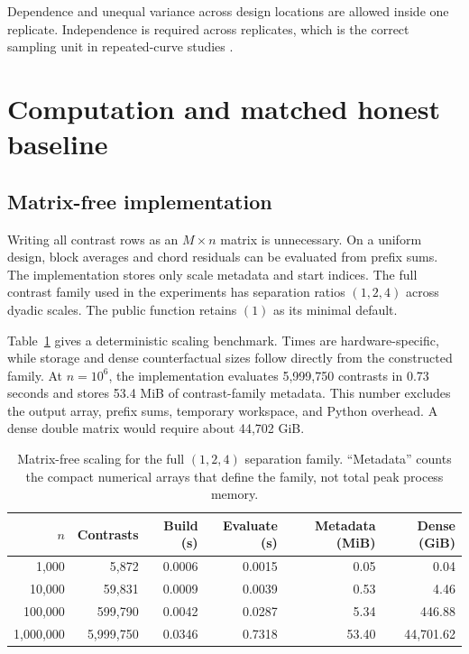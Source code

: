 \documentclass{interact}
\theoremstyle{definition}
\theoremstyle{remark}
\begin{document}
Dependence and unequal variance across design locations are allowed inside one
replicate.  Independence is required across replicates, which is the correct
sampling unit in repeated-curve studies \citep{davidian1995nonlinear}.

\section{Computation and matched honest baseline}
\label{sec:computation}

\subsection{Matrix-free implementation}

Writing all contrast rows as an $M\times n$ matrix is unnecessary.  On a
uniform design, block averages and chord residuals can be evaluated from prefix
sums.  The implementation stores only scale metadata and start indices.  The
full contrast family used in the experiments has separation ratios $(1,2,4)$
across dyadic scales.  The public function retains $(1)$ as its minimal
default.

Table~\ref{tab:scaling} gives a deterministic scaling benchmark.  Times are
hardware-specific, while storage and dense counterfactual sizes follow directly
from the constructed family.  At $n=10^6$, the implementation evaluates
5,999,750 contrasts in 0.73 seconds and stores 53.4 MiB of contrast-family
metadata.  This number excludes the output array, prefix sums, temporary
workspace, and Python overhead.  A dense double matrix would require about
44,702 GiB.

\begin{table}[htbp]
\centering
\caption{Matrix-free scaling for the full $(1,2,4)$ separation family.
``Metadata'' counts the compact numerical arrays that define the family, not
total peak process memory.}
\label{tab:scaling}
\small
\begin{tabular}{rrrrrr}
\toprule
$n$ & Contrasts & Build (s) & Evaluate (s) & Metadata (MiB) & Dense (GiB)\\
\midrule
1,000     & 5,872     & 0.0006 & 0.0015 & 0.05 & 0.04\\
10,000    & 59,831    & 0.0009 & 0.0039 & 0.53 & 4.46\\
100,000   & 599,790   & 0.0042 & 0.0287 & 5.34 & 446.88\\
1,000,000 & 5,999,750 & 0.0346 & 0.7318 & 53.40 & 44,701.62\\
\bottomrule
\end{tabular}
\end{table}
\end{document}
